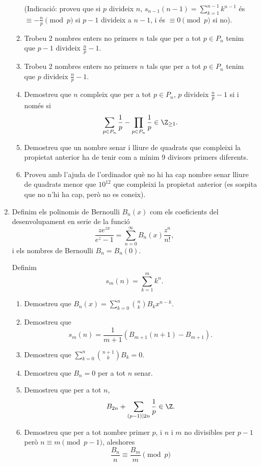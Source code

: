 \begin{enumerate}[leftmargin=*]
\begin{enumerate}
(Indicació: proveu que si $p$ divideix $n$, $s_{n-1}(n-1)=\sum_{k=1}^{n-1}
k^{n-1}$ és $\equiv -\frac np\pmod{p}$ si $p-1$ divideix a $n-1$, i
és $\equiv 0\pmod{p}$ si no).
\item Trobeu 2 nombres enters no primers $n$ tals que per a tot $p\in P_n$
tenim que $p-1$ divideix $\frac np -1$.
\item Trobeu 2 nombres enters no primers $n$ tals que per a tot $p\in P_n$
tenim que $p$ divideix $\frac np -1$.
\item Demostreu que $n$ compleix que per a tot $p\in P_n$,
$p$ divideix $\frac np -1$ si i només si
$$\sum_{p\in P_n}\frac 1p -\prod_{p\in P_n}\frac 1p \in \Z_{\ge 1}.$$
\item Demostreu que un nombre senar i lliure de quadrats que
compleixi la propietat anterior ha de tenir com a mínim 9 divisors
primers diferents.
\item Proveu amb l'ajuda de l'ordinador qu\`{e} no hi ha cap nombre
senar lliure de quadrats menor que $10^{12}$ que compleixi la
propietat anterior (es sospita que no n'hi ha cap, però no es
coneix).
\end{enumerate}



\item Definim els polinomis de Bernoulli $B_{n}(x)$ com els
coeficients del desenvolupament en serie de la funció
$$\frac{ze^{zx}}{e^z-1}=\sum_{n=0}^{\infty} B_n(x) \frac{z^n}{n!},$$
i els nombres de Bernoulli $B_n=B_n(0)$.

Definim $$s_m(n)=\sum_{k=1}^{m} k^{n}.$$

\begin{enumerate}
\item Demostreu que $B_n(x)=\sum_{k=0}^n \binom{n}{k} B_k
x^{n-k}$.
\item Demostreu que
$$s_m(n)=\frac{1}{m+1}(B_{m+1}(n+1)-B_{m+1}).$$
\item Demostreu que
$\sum_{k=0}^n \binom{n+1}{k} B_k=0$.
\item Demostreu que $B_n=0$ per a tot $n$ senar.
\item Demostreu que per a tot $n$,
$$B_{2n}+\sum_{(p-1)\mid 2n} \frac 1p \in \Z.$$
\item Demostreu que per a tot nombre primer $p$, i $n$ i $m$ no
divisibles per $p-1$ però $n\equiv m \pmod{p-1}$, aleshores
$$\frac{B_n}{n}\equiv \frac{B_m}{m} \pmod{p}$$
\end{enumerate}



\end{enumerate}
